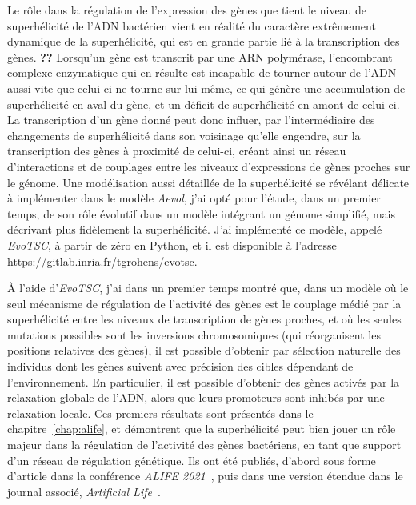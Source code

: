 Le rôle dans la régulation de l'expression des gènes que tient le niveau de superhélicité de l'ADN bactérien vient en réalité du caractère extrêmement dynamique de la superhélicité, qui est en grande partie lié à la transcription des gènes. \textbf{??}
Lorsqu'un gène est transcrit par une ARN polymérase, l'encombrant complexe enzymatique qui en résulte est incapable de tourner autour de l'ADN aussi vite que celui-ci ne tourne sur lui-même, ce qui génère une accumulation de superhélicité en aval du gène, et un déficit de superhélicité en amont de celui-ci.
La transcription d'un gène donné peut donc influer, par l'intermédiaire des changements de superhélicité dans son voisinage qu'elle engendre, sur la transcription des gènes à proximité de celui-ci, créant ainsi un réseau d'interactions et de couplages entre les niveaux d'expressions de gènes proches sur le génome.
Une modélisation aussi détaillée de la superhélicité se révélant délicate à implémenter dans le modèle \emph{Aevol}, j'ai opté pour l'étude, dans un premier temps, de son rôle évolutif dans un modèle intégrant un génome simplifié, mais décrivant plus fidèlement la superhélicité.
J'ai implémenté ce modèle, appelé \emph{EvoTSC}, à partir de zéro en Python, et il est disponible à l'adresse \url{https://gitlab.inria.fr/tgrohens/evotsc}.

À l'aide d'\emph{EvoTSC}, j'ai dans un premier temps montré que, dans un modèle où le seul mécanisme de régulation de l'activité des gènes est le couplage médié par la superhélicité entre les niveaux de transcription de gènes proches, et où les seules mutations possibles sont les inversions chromosomiques (qui réorganisent les positions relatives des gènes), il est possible d'obtenir par sélection naturelle des individus dont les gènes suivent avec précision des cibles dépendant de l'environnement.
En particulier, il est possible d'obtenir des gènes activés par la relaxation globale de l'ADN, alors que leurs promoteurs sont inhibés par une relaxation locale.
Ces premiers résultats sont présentés dans le chapitre~\ref{chap:alife}, et démontrent que la superhélicité peut bien jouer un rôle majeur dans la régulation de l'activité des gènes bactériens, en tant que support d'un réseau de régulation génétique.
Ils ont été publiés, d'abord sous forme d'article dans la conférence \emph{ALIFE 2021}~\citep{grohens2021}, puis dans une version étendue dans le journal associé, \emph{Artificial Life}~\citep{grohens2022a}.

